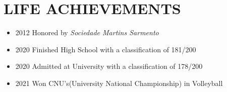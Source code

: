 \documentclass[paper=a4,fontsize=11pt]{scrartcl} %
\newcommand{\NewPart}[1]{\section*{\uppercase{#1}}}
\begin{document}

\NewPart{Life Achievements}{}

\begin{itemize}
    \item[] 2012 Honored by \textit{Sociedade Martins Sarmento} 
    \item[] 2020 Finished High School with a classification of 181/200 
    \item[] 2020 Admitted at University with a classification of 178/200
    \item[] 2021 Won CNU's(University National Championship) in Volleyball
\end{itemize}
\end{document}

